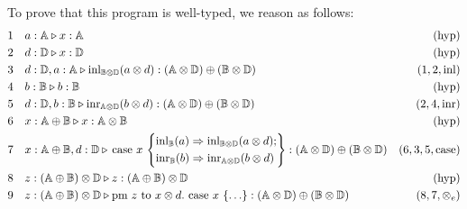 \begin{example}
To prove that this program is well-typed, we reason as follows:
\begin{equation*}
\begin{split}
1  \hspace{10 pt} & a : \mathbb{A}  \triangleright x : \mathbb{A}  & {(\text{hyp})} \\
2  \hspace{10 pt} & d : \mathbb{D}  \triangleright x : \mathbb{D}  & {(\text{hyp})} \\
3  \hspace{10 pt} & d : \mathbb{D}, a : \mathbb{A}  \triangleright \mathrm{inl}_{\mathbb{B} \otimes \mathbb{D}}(a \otimes d): (\mathbb{A} \otimes \mathbb{D}) \oplus (\mathbb{B} \otimes \mathbb{D})  & {(1,2,\text{inl})} \\
4  \hspace{10 pt} & b : \mathbb{B}  \triangleright  b: \mathbb{B}  & {(\text{hyp})} \\
5  \hspace{10 pt} & d : \mathbb{D},b : \mathbb{B}  \triangleright \mathrm{inr}_{\mathbb{A} \otimes \mathbb{D}}(b \otimes d): (\mathbb{A} \otimes \mathbb{D}) \oplus (\mathbb{B} \otimes \mathbb{D})  & {(2,4,\text{inr})} \\
6  \hspace{10 pt} & x : \mathbb{A} \oplus \mathbb{B} \triangleright x : \mathbb{A} \otimes \mathbb{B}  \hspace{10 pt} & {(\text{hyp})} \\ 
7 \hspace{10 pt} &    x: \mathbb{\mathbb{A} \oplus \mathbb{B}},  d: \mathbb{D} \triangleright \, 
\text{case } x \,  
  \left\{
    \begin{aligned} 
    &\mathrm{inl}_{\mathbb{B}}(a) \Rightarrow \mathrm{inl}_{\mathbb{B} \otimes \mathbb{D}}(a \otimes d); \\
    &\mathrm{inr}_{\mathbb{B}}(b) \Rightarrow \mathrm{inr}_{\mathbb{A} \otimes \mathbb{D}}(b \otimes d)   \\ 
  \end{aligned}  
  \right\}: (\mathbb{A} \otimes \mathbb{D}) \oplus (\mathbb{B} \otimes \mathbb{D})  & \text{($6,3,5,\text{case}$)} \\
  8 \hspace{10 pt} & z : \mathbb{(A \oplus B) \otimes D} \triangleright z : \mathbb{(A \oplus B) \otimes D}  \hspace{10 pt} & {(\text{hyp})} \\
9 \hspace{10 pt} &  z:(\mathbb{A} \oplus \mathbb{\mathbb{B}}) \otimes \mathbb{\mathbb{D}} \triangleright \text{pm } z \text{ to } x \otimes d. \text{ case } x\,\left\{ \ldots
    \right\}: (\mathbb{A} \otimes \mathbb{D}) \oplus (\mathbb{B} \otimes \mathbb{D}) & \text{($8,7,\otimes_{e}$)} \\
\end{split}
\end{equation*}



\end{example}
